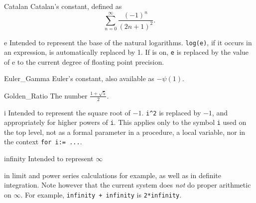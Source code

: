 \begin{list}{}{\renewcommand{\makelabel}[1]{\texttt{#1}\hspace{\fill}}%
               \setlength{\labelsep}{1em}%
               }

\item[Catalan] Catalan's constant, defined as
  \[
    \sum_{n=0}^{\infty} \frac{(-1)^{n}}{(2n+1)^{2}} .
  \]

\item[e] Intended to represent the base of
the natural logarithms.  \texttt{log(e)}, if it occurs in an expression, is
automatically replaced by 1.  If  is
on, \texttt{e} is replaced by the value of e to the current degree of
floating point precision.

\item[Euler\_Gamma] Euler's constant, also available as $-\psi(1)$.

\item[Golden\_Ratio] The number $\frac{1+\sqrt{5}}{2}$.

\item[i] Intended to represent the square
root of $-1$. \texttt{i\textasciicircum2} is replaced by $-1$, and
appropriately for higher powers of \texttt{i}.  This applies only to the
symbol \texttt{i} used on the top
level, not as a formal parameter in a procedure, a local variable, nor in
the context \texttt{for i:= ...}.

\item[infinity] Intended to represent $\infty$

in limit and power series calculations for example, as well as in definite integration.
Note however that the
current system does \emph{not} do proper arithmetic on $\infty$.  For example,
\texttt{infinity + infinity} is \texttt{2*infinity}.


\end{list}

